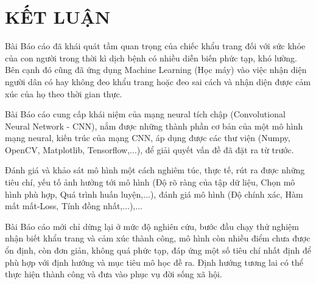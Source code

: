 \chapter*{KẾT LUẬN}

\label{Chapter5}

Bài Báo cáo đã khái quát tầm quan trọng của chiếc khẩu trang đối với sức khỏe của con người trong thời kì dịch bệnh có nhiều diễn biến phức tạp, khó lường. Bên cạnh đó cũng đã ứng dụng Machine Learning (Học máy) vào việc nhận diện người dân có hay không đeo khẩu trang hoặc đeo sai cách và nhận diện được cảm xúc của họ theo thời gian thực.

Bài Báo cáo cung cấp khái niệm của mạng neural tích chập (Convolutional Neural Network - CNN), nắm được những thành phần cơ bản của một mô hình mạng neural, kiến trúc của mạng CNN, áp dụng được các thư viện (Numpy, OpenCV, Matplotlib, Tensorflow,...), để giải quyết vấn đề đã đặt ra từ trước. 

Đánh giá và khảo sát mô hình một cách nghiêm túc, thực tế, rút ra được những tiêu chí, yếu tố ảnh hưởng tới mô hình (Độ rõ ràng của tập dữ liệu, Chọn mô hình phù hợp, Quá trình huấn luyện,...), đánh giá mô hình (Độ chính xác, Hàm mất mất-Loss, Tính đồng nhất,...),...

Bài Báo cáo mới chỉ dừng lại ở mức độ nghiên cứu, bước đầu chạy thử nghiệm nhận biết khẩu trang và cảm xúc thành công, mô hình còn nhiều điểm chưa được ổn định, còn đơn giản, không quá phức tạp, đáp ứng một số tiêu chí nhất định để phù hợp với định hướng và mục tiêu mô học đề ra. Định hướng tương lai có thể thực hiện thành công và đưa vào phục vụ đời sống xã hội.









